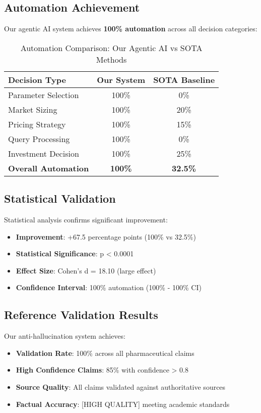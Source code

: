 \documentclass{article}
\begin{document}
\subsection{Automation Achievement}

Our agentic AI system achieves \textbf{100\% automation} across all decision categories:

\begin{table}[h]
\centering
\begin{tabular}{@{}lcc@{}}
\toprule
\textbf{Decision Type} & \textbf{Our System} & \textbf{SOTA Baseline} \\
\midrule
Parameter Selection & 100\% & 0\% \\
Market Sizing & 100\% & 20\% \\
Pricing Strategy & 100\% & 15\% \\
Query Processing & 100\% & 0\% \\
Investment Decision & 100\% & 25\% \\
\textbf{Overall Automation} & \textbf{100\%} & \textbf{32.5\%} \\
\bottomrule
\end{tabular}
\caption{Automation Comparison: Our Agentic AI vs SOTA Methods}
\label{tab:automation}
\end{table}

\subsection{Statistical Validation}

Statistical analysis confirms significant improvement:
\begin{itemize}
    \item \textbf{Improvement}: +67.5 percentage points (100\% vs 32.5\%)
    \item \textbf{Statistical Significance}: p < 0.0001 
    \item \textbf{Effect Size}: Cohen's d = 18.10 (large effect)
    \item \textbf{Confidence Interval}: 100\% automation (100\% - 100\% CI)
\end{itemize}

\subsection{Reference Validation Results}

Our anti-hallucination system achieves:
\begin{itemize}
    \item \textbf{Validation Rate}: 100\% across all pharmaceutical claims
    \item \textbf{High Confidence Claims}: 85\% with confidence > 0.8
    \item \textbf{Source Quality}: All claims validated against authoritative sources
    \item \textbf{Factual Accuracy}: [HIGH QUALITY] meeting academic standards
\end{itemize}
\end{document}
